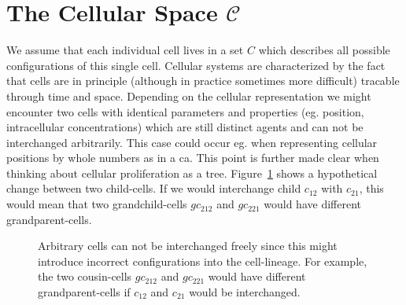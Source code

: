 \documentclass{article}
\begin{document}
\section{The Cellular Space $\mathscr{C}$}
\label{section:cellular-space}
We assume that each individual cell lives in a set $C$ which describes all possible configurations
of this single cell.
Cellular systems are characterized by the fact that cells are in principle (although in
practice sometimes more difficult) tracable through time and space.
Depending on the cellular representation we might encounter two cells with identical parameters and
properties (eg. position, intracellular concentrations) which are still distinct agents and can not
be interchanged arbitrarily.
This case could occur eg. when representing cellular positions by whole numbers as in a
\ac{ca}.
This point is further made clear when thinking about cellular proliferation as a tree.
Figure~\ref{fig:cell-lineage-break} shows a hypothetical change between two child-cells.
If we would interchange child $c_{12}$ with $c_{21}$, this would mean that two grandchild-cells
$gc_{212}$ and $gc_{221}$ would have different grandparent-cells.

\begin{figure}
    \centering
        \caption{
            Arbitrary cells can not be interchanged freely since this might introduce incorrect
            configurations into the cell-lineage.
            For example, the two cousin-cells $gc_{212}$ and $gc_{221}$ would have different
            grandparent-cells if $c_{12}$ and $c_{21}$ would be interchanged.
        }
        \label{fig:cell-lineage-break}
\end{figure}
\end{document}

